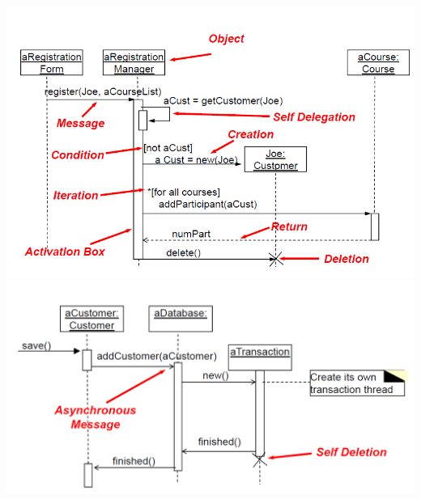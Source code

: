 \begin{multicols}{2}
	\includegraphics[width=\linewidth]{images/Modellierung/Sequenzdiagramm}
	\label{Bild1}
	\vfill\null
	\includegraphics[width=\linewidth]{images/Modellierung/Sequenzdiagramm2}
	\label{Bild2}
\end{multicols}

